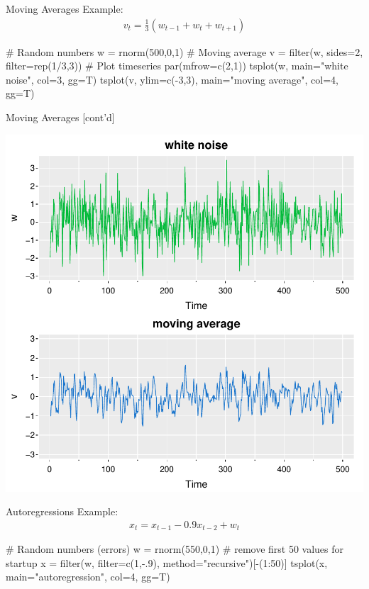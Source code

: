 \documentclass[ignorenonframetext,xcolor=x11names]{beamer}
\begin{document}
\begin{frame}[fragile]{Moving Averages}
Example:
\begin{align*}v_t = \frac{1}{3} ( w_{t-1} + w_t + w_{t+1})\end{align*}
\begin{Rcode}
# Random numbers
w = rnorm(500,0,1)
# Moving average
v = filter(w, sides=2, filter=rep(1/3,3))
# Plot timeseries
par(mfrow=c(2,1))
tsplot(w, 
    main="white noise", col=3, gg=T)
tsplot(v, ylim=c(-3,3), 
    main="moving average", col=4, gg=T)
\end{Rcode}
\end{frame}

\begin{frame}{Moving Averages \small [cont'd]}
\centering

\includegraphics[width=.75\textwidth]{figure2.pdf}
\end{frame}

\begin{frame}[fragile]{Autoregressions}
Example:
\begin{align*}x_t = x_{t-1} - 0.9 x_{t-2} + w_t\end{align*}
\begin{Rcode}
# Random numbers (errors)
w = rnorm(550,0,1)
# remove first 50 values for startup
x = filter(w, filter=c(1,-.9), 
              method="recursive")[-(1:50)]
tsplot(x, main="autoregression", col=4, gg=T)
\end{Rcode}
\end{frame}
\end{document}
